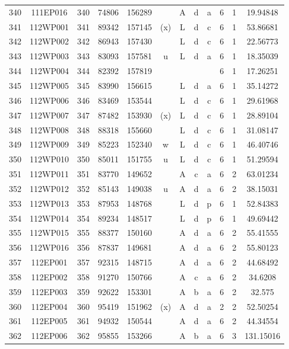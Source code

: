 \begin{tabular}{|*{12}{c|}}
340 & 111EP016 & 340 & 74806 & 156289 &  & A & d & a & 6 & 1 & 19.94848 \\ 
341 & 112WP001 & 341 & 89342 & 157145 & (x) & L & d & c & 6 & 1 & 53.86681 \\ 
342 & 112WP002 & 342 & 86943 & 157430 &  & L & d & c & 6 & 1 & 22.56773 \\ 
343 & 112WP003 & 343 & 83093 & 157581 & u & L & d & a & 6 & 1 & 18.35039 \\ 
344 & 112WP004 & 344 & 82392 & 157819 &  &  &  &  & 6 & 1 & 17.26251 \\ 
345 & 112WP005 & 345 & 83990 & 156615 &  & L & d & a & 6 & 1 & 35.14272 \\ 
346 & 112WP006 & 346 & 83469 & 153544 &  & L & d & c & 6 & 1 & 29.61968 \\ 
347 & 112WP007 & 347 & 87482 & 153930 & (x) & L & d & c & 6 & 1 & 28.89104 \\ 
348 & 112WP008 & 348 & 88318 & 155660 &  & L & d & c & 6 & 1 & 31.08147 \\ 
349 & 112WP009 & 349 & 85223 & 152340 & w & L & d & c & 6 & 1 & 46.40746 \\ 
350 & 112WP010 & 350 & 85011 & 151755 & u & L & d & c & 6 & 1 & 51.29594 \\ 
351 & 112WP011 & 351 & 83770 & 149652 &  & A & c & a & 6 & 2 & 63.01234 \\ 
352 & 112WP012 & 352 & 85143 & 149038 & u & A & d & a & 6 & 2 & 38.15031 \\ 
353 & 112WP013 & 353 & 87953 & 148768 &  & L & d & p & 6 & 1 & 52.84383 \\ 
354 & 112WP014 & 354 & 89234 & 148517 &  & L & d & p & 6 & 1 & 49.69442 \\ 
355 & 112WP015 & 355 & 88377 & 150160 &  & A & d & a & 6 & 2 & 55.41555 \\ 
356 & 112WP016 & 356 & 87837 & 149681 &  & A & d & a & 6 & 2 & 55.80123 \\ 
357 & 112EP001 & 357 & 92315 & 148715 &  & A & d & a & 6 & 2 & 44.68492 \\ 
358 & 112EP002 & 358 & 91270 & 150766 &  & A & c & a & 6 & 2 & 34.6208 \\ 
359 & 112EP003 & 359 & 92622 & 153301 &  & A & b & a & 6 & 2 & 32.575 \\ 
360 & 112EP004 & 360 & 95419 & 151962 & (x) & A & d & a & 2 & 2 & 52.50254 \\ 
361 & 112EP005 & 361 & 94932 & 150544 &  & A & d & a & 6 & 2 & 44.34554 \\ 
362 & 112EP006 & 362 & 95855 & 153266 &  & A & b & a & 6 & 3 & 131.15016 \\ 

\end{tabular}

